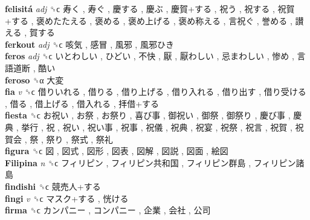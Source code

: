 \textbf{felisitá} \emph{adj}  ␝ϲ   寿く ,  寿ぐ ,  慶する ,  慶ぶ ,  慶賀+する ,  祝う ,  祝する ,  祝賀+する ,  褒めたたえる ,  褒める ,  褒め上げる ,  褒め称える ,  言祝ぐ ,  誉める ,  讃える ,  賀する   \\
\textbf{ferkout} \emph{adj}  ␝ϲ   咳気 ,  感冒 ,  風邪 ,  風邪ひき   \\
\textbf{feros} \emph{adj}  ␝ϲ   いとわしい ,  ひどい ,  不快 ,  厭 ,  厭わしい ,  忌まわしい ,  惨め ,  言語道断 ,  酷い   \\
\textbf{feroso} ␝α   大変   \\
\textbf{fia} \emph{v}  ␝ϲ   借りいれる ,  借りる ,  借り上げる ,  借り入れる ,  借り出す ,  借り受ける ,  借る ,  借上げる ,  借入れる ,  拝借+する   \\
\textbf{fiesta} ␝ϲ   お祝い ,  お祭 ,  お祭り ,  喜び事 ,  御祝い ,  御祭 ,  御祭り ,  慶び事 ,  慶典 ,  挙行 ,  祝 ,  祝い ,  祝い事 ,  祝事 ,  祝儀 ,  祝典 ,  祝宴 ,  祝祭 ,  祝言 ,  祝賀 ,  祝賀会 ,  祭 ,  祭り ,  祭式 ,  祭礼   \\
\textbf{figura} ␝ϲ   図 ,  図式 ,  図形 ,  図表 ,  図解 ,  図説 ,  図面 ,  絵図   \\
\textbf{Filipina} \emph{n}  ␝ϲ   フィリピン ,  フィリピン共和国 ,  フィリピン群島 ,  フィリピン諸島   \\
\textbf{findishi} ␝ϲ   競売人+する   \\
\textbf{fingi} \emph{v}  ␝ϲ   マスク+する ,  恍ける   \\
\textbf{firma} ␝ϲ   カンパニー ,  コンパニー ,  企業 ,  会社 ,  公司   \\
